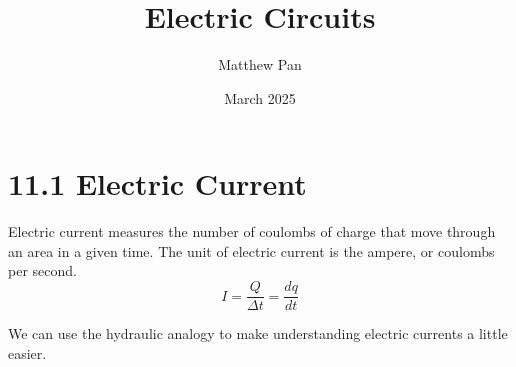 \documentclass[12pt, titlepage]{article}
\title{Electric Circuits}
\author{Matthew Pan}
\date{March 2025}
\begin{document}
\pagestyle{fancy}

\fancyhead{}
\fancyhead[R]{\thepage}

\maketitle

\section*{11.1 Electric Current}

Electric current measures the number of coulombs of charge that move through an area in a given time. The unit of electric current is the ampere, or coulombs per second.
\begin{equation*}
    I = \frac{Q}{\Delta t} = \frac{dq}{dt}
\end{equation*}

We can use the hydraulic analogy to make understanding electric currents a little easier. 
\end{document}
